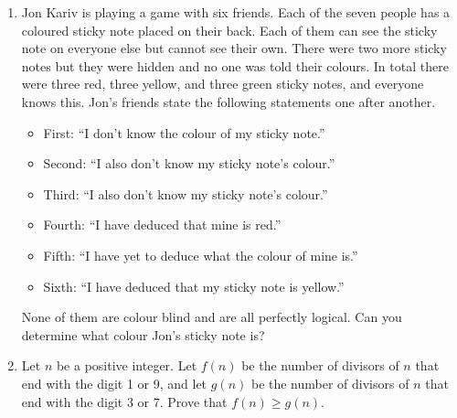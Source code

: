 \documentclass[12pt]{article}
\begin{document}
\begin{enumerate}[topsep=\bigskipamount,itemsep=\bigskipamount]
\item
Jon Kariv is playing a game with six friends.
Each of the seven people has a coloured sticky note placed on their back.
Each of them can see the sticky note on everyone else but cannot see their own.
There were two more sticky notes but they were hidden and no one was told their colours.
In total there were three red, three yellow, and three green sticky notes, and everyone knows this.
Jon's friends state the following statements one after another.
\begin{itemize}
\item First: ``I don't know the colour of my sticky note.''
\item Second: ``I also don't know my sticky note's colour.''
\item Third: ``I also don't know my sticky note's colour.''
\item Fourth: ``I have deduced that mine is red.''
\item Fifth: ``I have yet to deduce what the colour of mine is.''
\item Sixth: ``I have deduced that my sticky note is yellow.''
\end{itemize}
None of them are colour blind and are all perfectly logical.
Can you determine what colour Jon's sticky note is?

\item %
Let $n$ be a positive integer.
Let $f(n)$ be the number of divisors of $n$ that end with the digit 1 or 9, and let $g(n)$ be the number of divisors of $n$ that end with the digit 3 or 7.
Prove that $f(n) \geqslant g(n)$.

\end{enumerate}
\end{document}

